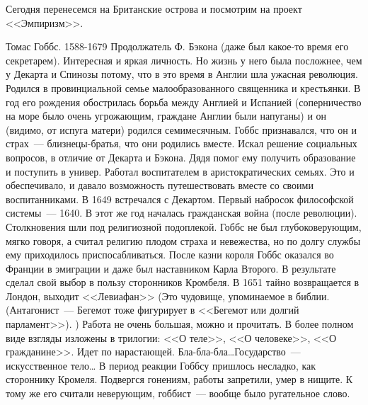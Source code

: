 Сегодня перенесемся на Британские острова и посмотрим на проект <<Эмпиризм>>.

Томас Гоббс. 1588-1679
Продолжатель Ф. Бэкона (даже был какое-то время его секретарем). Интересная и яркая личность. Но жизнь у него была посложнее, чем у Декарта и Спинозы потому, что в это время в Англии шла ужасная революция.
Родился в провинциальной семье малообразованного священника и крестьянки. В год его рождения обострилась борьба между Англией и Испанией (соперничество на море было очень угрожающим, граждане Англии были напуганы) и он (видимо, от испуга матери) родился семимесячным. Гоббс признавался, что он и страх~--- близнецы-братья, что они родились вместе. Искал решение социальных вопросов, в отличие от Декарта и Бэкона. Дядя помог ему получить образование и поступить в универ. Работал воспитателем в аристократических семьях. Это и обеспечивало, и давало возможность путешествовать вместе со своими воспитанниками. В 1649 встречался с Декартом. Первый набросок философской системы~--- 1640. В этот же год началась гражданская война (после революции). Столкновения шли под религиозной подоплекой. Гоббс не был глубоковерующим, мягко говоря, а считал религию плодом страха и невежества, но по долгу службы ему приходилось приспосабливаться. После казни короля Гоббс оказался во Франции в эмиграции и даже был наставником Карла Второго. В результате сделал свой выбор в пользу сторонников Кромбеля. 
В 1651 тайно возвращается в Лондон, выходит <<Левиафан>> (Это чудовище, упоминаемое в библии. (Антагонист~--- Бегемот тоже фигурирует в <<Бегемот или долгий парламент>>). ) Работа не очень большая, можно и прочитать. 
В более полном виде взгляды изложены в трилогии: <<О теле>>, <<О человеке>>, <<О гражданине>>. Идет по нарастающей. Бла-бла-бла\ldots Государство~--- искусственное тело\ldots
В период реакции Гоббсу пришлось несладко, как стороннику Кромеля. Подвергся гонениям, работы запретили, умер в нищите. К тому же его считали неверующим, гоббист~--- вообще было ругательное слово.


